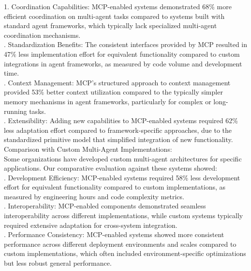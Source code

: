1. Coordination Capabilities: MCP-enabled systems demonstrated 68\% more efficient coordination on multi-agent tasks compared to systems built with standard agent frameworks, which typically lack specialized multi-agent coordination mechanisms.\\ . Standardization Benefits: The consistent interfaces provided by MCP resulted in 47\% less implementation effort for equivalent functionality compared to custom integrations in agent frameworks, as measured by code volume and development time.\\ . Context Management: MCP's structured approach to context management provided 53\% better context utilization compared to the typically simpler memory mechanisms in agent frameworks, particularly for complex or long-running tasks.\\ . Extensibility: Adding new capabilities to MCP-enabled systems required 62\% less adaptation effort compared to framework-specific approaches, due to the standardized primitive model that simplified integration of new functionality.\\ \newline
Comparison with Custom Multi-Agent Implementations:\\ \newline
Some organizations have developed custom multi-agent architectures for specific applications. Our comparative evaluation against these systems showed:\\ . Development Efficiency: MCP-enabled systems required 58\% less development effort for equivalent functionality compared to custom implementations, as measured by engineering hours and code complexity metrics.\\ . Interoperability: MCP-enabled components demonstrated seamless interoperability across different implementations, while custom systems typically required extensive adaptation for cross-system integration.\\ . Performance Consistency: MCP-enabled systems showed more consistent performance across different deployment environments and scales compared to custom implementations, which often included environment-specific optimizations but less robust general performance.\\ \newline
